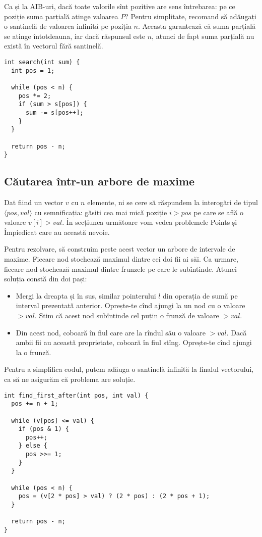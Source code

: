 Ca și la AIB-uri, dacă toate valorile sînt pozitive are sens întrebarea: pe ce poziție suma parțială atinge valoarea $P$? Pentru simplitate, recomand să adăugați o santinelă de valoarea infinită pe poziția $n$. Aceasta garantează că suma parțială se atinge întotdeauna, iar dacă răspunsul este $n$, atunci de fapt suma parțială nu există în vectorul fără santinelă.

\begin{verbatim}
int search(int sum) {
  int pos = 1;

  while (pos < n) {
    pos *= 2;
    if (sum > s[pos]) {
      sum -= s[pos++];
    }
  }

  return pos - n;
}
\end{verbatim}

\subsection{Căutarea într-un arbore de maxime}

Dat fiind un vector $v$ cu $n$ elemente, ni se cere să răspundem la interogări de tipul $\langle pos, val \rangle$ cu semnificația: găsiți cea mai mică poziție $i > pos$ pe care se află o valoare $v[i] > val$. În secțiunea următoare vom vedea problemele Points și Împiedicat care au această nevoie.

Pentru rezolvare, să construim peste acest vector un arbore de intervale de maxime. Fiecare nod stochează maximul dintre cei doi fii ai săi. Ca urmare, fiecare nod stochează maximul dintre frunzele pe care le subîntinde. Atunci soluția constă din doi pași:

\begin{itemize}
  \item Mergi la dreapta și în sus, similar pointerului $l$ din operația de sumă pe interval prezentată anterior. Oprește-te cînd ajungi la un nod cu o valoare $> val$. Știm că acest nod subîntinde cel puțin o frunză de valoare $> val$.
  \item Din acest nod, coboară în fiul care are la rîndul său o valoare $> val$. Dacă ambii fii au această proprietate, coboară în fiul stîng. Oprește-te cînd ajungi la o frunză.
\end{itemize}

Pentru a simplifica codul, putem adăuga o santinelă infinită la finalul vectorului, ca să ne asigurăm că problema are soluție.

\begin{verbatim}
int find_first_after(int pos, int val) {
  pos += n + 1;

  while (v[pos] <= val) {
    if (pos & 1) {
      pos++;
    } else {
      pos >>= 1;
    }
  }

  while (pos < n) {
    pos = (v[2 * pos] > val) ? (2 * pos) : (2 * pos + 1);
  }

  return pos - n;
}
\end{verbatim}

